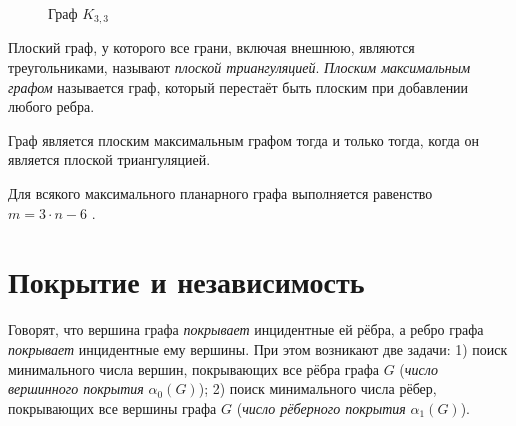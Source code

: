 \begin{figure}[h]
	\center
	\caption{Граф $K_{3,3}$}
	\label{graph k33}
\end{figure}

Плоский граф, у которого все грани, включая внешнюю, являются треугольниками, 
называют \emph{плоской триангуляцией}. \emph{Плоским максимальным графом} 
называется граф, который перестаёт быть плоским при добавлении любого ребра.

\begin{theorem}
Граф является плоским максимальным графом тогда и только тогда, когда он
является плоской триангуляцией.
\end{theorem}

Для всякого максимального планарного графа выполняется равенство $m=3 \cdot 
n-6$ .

\section{Покрытие и независимость}

Говорят, что вершина графа \emph{покрывает} инцидентные ей рёбра, а ребро графа 
\emph{покрывает} инцидентные ему вершины. При этом возникают две задачи: 1) 
поиск минимального числа вершин, покрывающих все рёбра графа $G$ (\emph{число 
вершинного покрытия} $\alpha_0(G)$); 2) поиск минимального числа рёбер, 
покрывающих все вершины графа $G$ (\emph{число рёберного покрытия} 
$\alpha_1(G)$).

